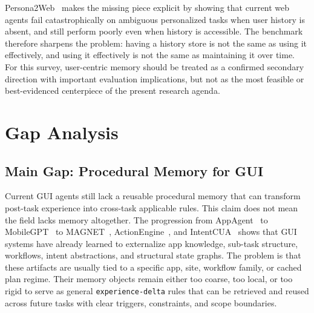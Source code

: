 \documentclass{article}
\begin{document}
Persona2Web~\parencite{kim2026persona2webbenchmarkingpersonalizedweb} makes the missing piece explicit by
showing that current web agents fail catastrophically on ambiguous
personalized tasks when user history is absent, and still perform poorly
even when history is accessible. The benchmark therefore sharpens the
problem: having a history store is not the same as using it effectively,
and using it effectively is not the same as maintaining it over time.
For this survey, user-centric memory should be treated as a confirmed
secondary direction with important evaluation implications, but not as
the most feasible or best-evidenced centerpiece of the present research
agenda.

\section{Gap Analysis}\label{6-gap-analysis}

\subsection{Main Gap: Procedural Memory for GUI}\label{61-main-gap-procedural-memory-for-gui}

Current GUI agents still lack a reusable procedural memory that can
transform post-task experience into cross-task applicable rules. This
claim does not mean the field lacks memory altogether. The progression
from AppAgent~\parencite{zhang2023appagentmultimodalagentssmartphone} to
MobileGPT~\parencite{lee2024exploreselectderiverecall} to
MAGNET~\parencite{sun2026magnetadaptiveguiagents},
ActionEngine~\parencite{zhong2026actionenginereactiveprogrammaticgui}, and
IntentCUA~\parencite{lee2026intentcualearningintentlevelrepresentations} shows that GUI systems have
already learned to externalize app knowledge, sub-task structure,
workflows, intent abstractions, and structural state graphs. The
problem is that these artifacts are usually tied to a specific app,
site, workflow family, or cached plan regime. Their memory objects
remain either too coarse, too local, or too rigid to serve as general
\texttt{experience-delta} rules that can be retrieved and reused across
future tasks with clear triggers, constraints, and scope boundaries.
\end{document}
